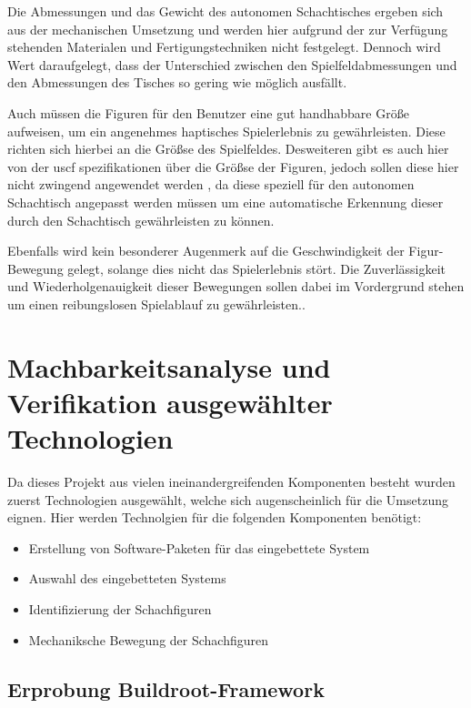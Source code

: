 Die Abmessungen und das Gewicht des autonomen Schachtisches ergeben sich
aus der mechanischen Umsetzung und werden hier aufgrund der zur
Verfügung stehenden Materialen und Fertigungstechniken nicht festgelegt.
Dennoch wird Wert daraufgelegt, dass der Unterschied zwischen den
Spielfeldabmessungen und den Abmessungen des Tisches so gering wie
möglich ausfällt.

Auch müssen die Figuren für den Benutzer eine gut handhabbare Größe
aufweisen, um ein angenehmes haptisches Spielerlebnis zu gewährleisten.
Diese richten sich hierbei an die Größse des Spielfeldes. Desweiteren
gibt es auch hier von der \gls{uscf}\cite{officialuscfrules}
spezifikationen über die Größse der Figuren, jedoch sollen diese hier
nicht zwingend angewendet werden , da diese speziell für den autonomen
Schachtisch angepasst werden müssen um eine automatische Erkennung
dieser durch den Schachtisch gewährleisten zu können.

Ebenfalls wird kein besonderer Augenmerk auf die Geschwindigkeit der
Figur-Bewegung gelegt, solange dies nicht das Spielerlebnis stört. Die
Zuverlässigkeit und Wiederholgenauigkeit dieser Bewegungen sollen dabei
im Vordergrund stehen um einen reibungslosen Spielablauf zu
gewährleisten..

\hypertarget{machbarkeitsanalyse-und-verifikation-ausgewuxe4hlter-technologien}{%
\chapter{Machbarkeitsanalyse und Verifikation ausgewählter
Technologien}\label{machbarkeitsanalyse-und-verifikation-ausgewuxe4hlter-technologien}}

Da dieses Projekt aus vielen ineinandergreifenden Komponenten besteht
wurden zuerst Technologien ausgewählt, welche sich augenscheinlich für
die Umsetzung eignen. Hier werden Technolgien für die folgenden
Komponenten benötigt:

\begin{itemize}
\tightlist
\item
  Erstellung von Software-Paketen für das eingebettete System
\item
  Auswahl des eingebetteten Systems
\item
  Identifizierung der Schachfiguren
\item
  Mechaniksche Bewegung der Schachfiguren
\end{itemize}

\hypertarget{erprobung-buildroot-framework}{%
\section{Erprobung
Buildroot-Framework}\label{erprobung-buildroot-framework}}


